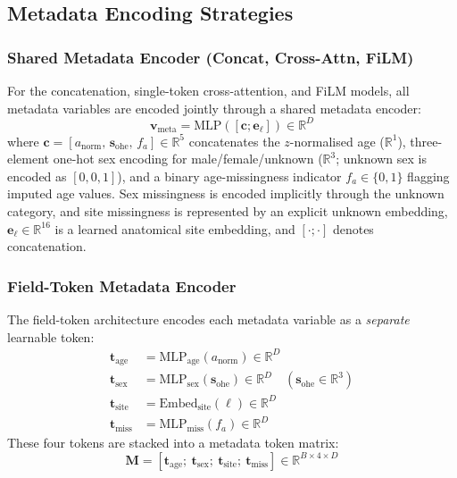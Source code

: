 \documentclass[12pt, a4paper]{article}
\newcommand{\R}{\mathbb{R}}
\begin{document}
\subsection{Metadata Encoding Strategies}

\subsubsection{Shared Metadata Encoder (Concat, Cross-Attn, FiLM)}

For the concatenation, single-token cross-attention, and FiLM models, all metadata variables are encoded jointly through a shared metadata encoder:
\begin{equation}
    \mathbf{v}_{\text{meta}} = \text{MLP}\left([\mathbf{c}; \mathbf{e}_\ell]\right) \in \R^{D}
\end{equation}
where $\mathbf{c} = [a_{\text{norm}},\, \mathbf{s}_{\text{ohe}},\, f_a] \in \R^5$ concatenates the $z$-normalised age ($\R^1$), three-element one-hot sex encoding for male/female/unknown ($\R^3$; unknown sex is encoded as $[0,0,1]$), and a binary age-missingness indicator $f_a \in \{0,1\}$ flagging imputed age values. Sex missingness is encoded implicitly through the unknown category, and site missingness is represented by an explicit unknown embedding, $\mathbf{e}_\ell \in \R^{16}$ is a learned anatomical site embedding, and $[\cdot ; \cdot]$ denotes concatenation.

\subsubsection{Field-Token Metadata Encoder}

The field-token architecture encodes each metadata variable as a \emph{separate} learnable token:
\begin{align}
    \mathbf{t}_{\text{age}} &= \text{MLP}_{\text{age}}(a_{\text{norm}}) \in \R^D \label{eq:t_age} \\
    \mathbf{t}_{\text{sex}} &= \text{MLP}_{\text{sex}}(\mathbf{s}_{\text{ohe}}) \in \R^D \quad (\mathbf{s}_{\text{ohe}} \in \R^3) \\
    \mathbf{t}_{\text{site}} &= \text{Embed}_{\text{site}}(\ell) \in \R^D \\
    \mathbf{t}_{\text{miss}} &= \text{MLP}_{\text{miss}}(f_a) \in \R^D \label{eq:t_miss}
\end{align}
These four tokens are stacked into a metadata token matrix:
\begin{equation}
    \mathbf{M} = [\mathbf{t}_{\text{age}};\ \mathbf{t}_{\text{sex}};\ \mathbf{t}_{\text{site}};\ \mathbf{t}_{\text{miss}}] \in \R^{B \times 4 \times D}
    \label{eq:field_tokens}
\end{equation}
\end{document}
